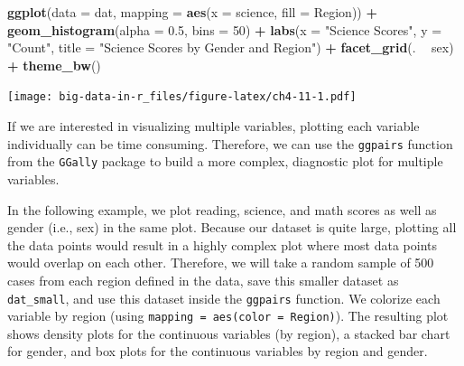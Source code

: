 \documentclass[]{book}
\newenvironment{Shaded}{\begin{snugshade}}{\end{snugshade}}
\newcommand{\DataTypeTok}[1]{\textcolor[rgb]{0.13,0.29,0.53}{#1}}
\newcommand{\DecValTok}[1]{\textcolor[rgb]{0.00,0.00,0.81}{#1}}
\newcommand{\FloatTok}[1]{\textcolor[rgb]{0.00,0.00,0.81}{#1}}
\newcommand{\KeywordTok}[1]{\textcolor[rgb]{0.13,0.29,0.53}{\textbf{#1}}}
\newcommand{\NormalTok}[1]{#1}
\newcommand{\OperatorTok}[1]{\textcolor[rgb]{0.81,0.36,0.00}{\textbf{#1}}}
\newcommand{\StringTok}[1]{\textcolor[rgb]{0.31,0.60,0.02}{#1}}
\begin{document}
\begin{Shaded}
\begin{Highlighting}[]
\KeywordTok{ggplot}\NormalTok{(}\DataTypeTok{data =}\NormalTok{ dat,}
       \DataTypeTok{mapping =} \KeywordTok{aes}\NormalTok{(}\DataTypeTok{x =}\NormalTok{ science, }\DataTypeTok{fill =}\NormalTok{ Region)) }\OperatorTok{+}
\StringTok{  }\KeywordTok{geom_histogram}\NormalTok{(}\DataTypeTok{alpha =} \FloatTok{0.5}\NormalTok{, }\DataTypeTok{bins =} \DecValTok{50}\NormalTok{) }\OperatorTok{+}
\StringTok{  }\KeywordTok{labs}\NormalTok{(}\DataTypeTok{x =} \StringTok{"Science Scores"}\NormalTok{, }\DataTypeTok{y =} \StringTok{"Count"}\NormalTok{,}
       \DataTypeTok{title =} \StringTok{"Science Scores by Gender and Region"}\NormalTok{) }\OperatorTok{+}
\StringTok{  }\KeywordTok{facet_grid}\NormalTok{(. }\OperatorTok{~}\StringTok{ }\NormalTok{sex) }\OperatorTok{+}
\StringTok{  }\KeywordTok{theme_bw}\NormalTok{()}
\end{Highlighting}
\end{Shaded}

\texttt{[image: big-data-in-r\_files/figure-latex/ch4-11-1.pdf]}

If we are interested in visualizing multiple variables, plotting each variable individually can be time consuming. Therefore, we can use the \texttt{ggpairs} function from the \texttt{GGally} package to build a more complex, diagnostic plot for multiple variables.

In the following example, we plot reading, science, and math scores as well as gender (i.e., sex) in the same plot. Because our dataset is quite large, plotting all the data points would result in a highly complex plot where most data points would overlap on each other. Therefore, we will take a random sample of 500 cases from each region defined in the data, save this smaller dataset as \texttt{dat\_small}, and use this dataset inside the \texttt{ggpairs} function. We colorize each variable by region (using \texttt{mapping\ =\ aes(color\ =\ Region)}). The resulting plot shows density plots for the continuous variables (by region), a stacked bar chart for gender, and box plots for the continuous variables by region and gender.
\end{document}
